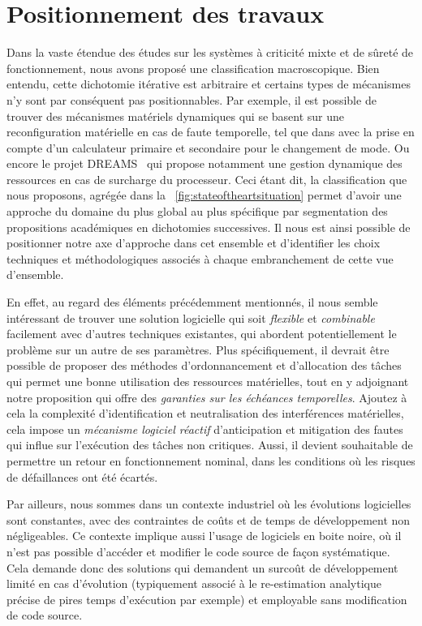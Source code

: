 \documentclass[french, a4paper, 11pt, twoside, pdftex]{StyleThese}
\begin{document}
   \section{Positionnement des travaux}
   
   Dans la vaste étendue des études sur les systèmes à criticité mixte et de sûreté de fonctionnement, nous avons proposé une classification macroscopique. Bien entendu, cette dichotomie itérative est arbitraire et certains types de mécanismes n'y sont par conséquent pas positionnables. Par exemple, il est possible de trouver des mécanismes matériels dynamiques qui se basent sur une reconfiguration matérielle en cas de faute temporelle, tel que dans \cite{lin_scheduling_2015} avec la prise en compte d'un calculateur primaire et secondaire pour le changement de mode. Ou encore le projet DREAMS~\cite{fohler_evaluation_2018} qui propose notamment une gestion dynamique des ressources en cas de surcharge du processeur. Ceci étant dit, la classification que nous proposons, agrégée dans la ~\autoref{fig:stateoftheartsituation} permet d'avoir une approche du domaine du plus global au plus spécifique par segmentation des propositions académiques en dichotomies successives. Il nous est ainsi possible de positionner notre axe d'approche dans cet ensemble et d'identifier les choix techniques et méthodologiques associés à chaque embranchement de cette vue d'ensemble.
   
   En effet, au regard des éléments précédemment mentionnés, il nous semble intéressant de trouver une solution logicielle qui soit \textit{flexible} et \textit{combinable} facilement avec d'autres techniques existantes, qui abordent potentiellement le problème sur un autre de ses paramètres. Plus spécifiquement, il devrait être possible de proposer des méthodes d'ordonnancement et d'allocation des tâches qui permet une bonne utilisation des ressources matérielles, tout en y adjoignant notre proposition qui offre des \textit{garanties sur les échéances temporelles}. 
   Ajoutez à cela la complexité d'identification et neutralisation des interférences matérielles, cela impose un \textit{mécanisme logiciel réactif} d'anticipation et mitigation des fautes qui influe sur l'exécution des tâches non critiques. 
   Aussi, il devient souhaitable de permettre un retour en fonctionnement nominal, dans les conditions où les risques de défaillances ont été écartés. 
   
   Par ailleurs, nous sommes dans un contexte industriel où les évolutions logicielles sont constantes, avec des contraintes de coûts et de temps de développement non négligeables. Ce contexte implique aussi l'usage de logiciels en boite noire, où il n'est pas possible d'accéder et modifier le code source de façon systématique. Cela demande donc des solutions qui demandent un surcoût de développement limité en cas d'évolution (typiquement associé à le re-estimation analytique précise de pires temps d'exécution par exemple) et employable sans modification de code source.
   
\end{document}
